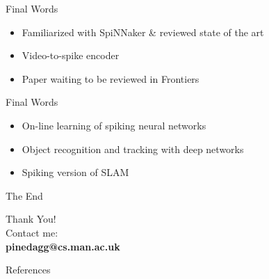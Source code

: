 \documentclass[17pt,mathserif]{beamer}
\begin{document}
    \begin{frame}{Final Words}
        \vspace*{-3em}
        \begin{itemize}
          \item[$\checkmark$] Familiarized with SpiNNaker \& reviewed state of the art
          \item[$\checkmark$] Video-to-spike encoder
          \item[$\checkmark$] Paper waiting to be reviewed in Frontiers
        \end{itemize}
    \end{frame}

    \begin{frame}{Final Words}
      \vspace*{-3em}
      \begin{itemize}
        \item[{\footnotesize [\textsc{to do}]}] On-line learning of spiking neural networks
        \item[{\footnotesize [\textsc{to do}]}] Object recognition and tracking with deep networks
        \item[{\footnotesize [\textsc{to do}]}] Spiking version of SLAM
      \end{itemize}
    \end{frame}

    \begin{frame}{The End}
      \begin{center}
          \vspace*{-3em}
          {\Large Thank You!}\\
          \vspace*{0.5em}
          Contact me:\\[1em]
          {\Large \textbf{pinedagg@cs.man.ac.uk}}\\
      \end{center}
    \end{frame}
    
    \begin{frame}{References}
      \vspace*{-3em}
      \printbibliography

    \end{frame}
\end{document}
